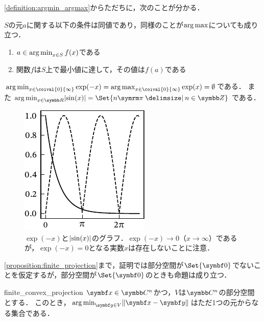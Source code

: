 \documentclass[../../main]{subfiles}
\begin{document}
\cref{definition:argmin_argmax}からただちに，次のことが分かる．

\begin{proposition}{}{}
  \(S\)の元\(a\)に関する以下の条件は同値であり，同様のことが\(\operatorname*{arg\,max}\)についても成り立つ．
  \begin{enumerate}
    \item \(a\in\operatorname*{arg\,min}_{x\in S}f(x)\)である
    \item 関数\(f\)は\(S\)上で最小値に達して，その値は\(f(a)\)である
  \end{enumerate}
\end{proposition}

\begin{example}
  \(\argmin_{x\in\coival{0}{\infty}}\exp(-x)=\argmax_{x\in\coival{0}{\infty}}\exp(x)=\emptyset\)である．
  また\(\argmin_{x\in\numset{R}}\abs{\sin(x)}=\Set{n\krez\given n\in\numset{Z}}\)である．
\end{example}

\begin{figure}[htbp]
  \centering
  \includegraphics{argmin.pdf}
  \caption{\(\exp(-x)\)と\(\lvert\sin(x)\rvert\)のグラフ．\(\exp(-x)\to 0\)（\(x\to\infty\)）であるが，\(\exp(-x)=0\)となる実数\(x\)は存在しないことに注意．}
\end{figure}

\cref{proposition:finite_projection}まで，証明では部分空間が\(\Set{\zvec}\)でないことを仮定するが，部分空間が\(\Set{\zvec}\)のときも命題は成り立つ．

\begin{proposition}{}{finite_convex_projection}
  \(\vect{x}\in\numset{C}^n\)かつ，\(V\)は\(\numset{C}^n\)の部分空間とする．
  このとき，\(\argmin_{\vect{y}\in V}\vnorm{\vect{x}-\vect{y}}\)はただ1つの元からなる集合である．
\end{proposition}
\end{document}
